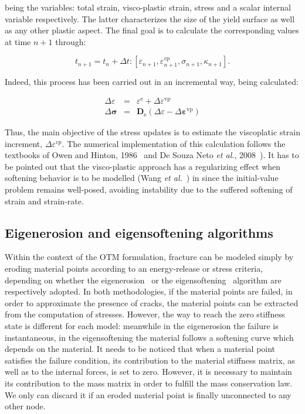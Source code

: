 \documentclass[applsci,journal,article,submit,moreauthors,pdftex]{Definitions/mdpi}
\begin{document}
\noindent being the variables: total strain, visco-plastic strain, stress and a scalar internal variable respectively. The latter characterizes the size of the yield surface as well as any other plastic aspect. The final goal is to calculate the corresponding values at time $n+1$ through:

\begin{equation}
t_{n+1}=t_{n}+\Delta t:\left[\varepsilon_{n+1}, \varepsilon_{n+1}^{v p}, \sigma_{n+1}, \kappa_{n+1}\right].
\end{equation}

Indeed, this process has been carried out in an incremental way, being calculated:

\begin{eqnarray}
\Delta \varepsilon &=& \varepsilon^{\mathrm{e}}+\Delta \varepsilon^{\mathrm{vp}} \\
\Delta \boldsymbol{\sigma} &=& \mathbf{D}_{\mathrm{e}}\left(\Delta \varepsilon-\Delta \boldsymbol{\varepsilon}^{\mathrm{vp}}\right)
\end{eqnarray}


Thus, the main objective of the stress updates is to estimate the viscoplatic strain increment, $\Delta \varepsilon^{v p}.$ The numerical implementation of this calculation follows the textbooks of Owen and Hinton, 1986~\cite{Owen1981} and De Souza Neto \textit{et al.}, 2008~\cite{DPOwen2005}). It has to be pointed out that the visco-plastic approach has a regularizing effect when softening behavior is to be modelled (Wang \textit{et al.}~\cite{Wang:1997}) in since the initial-value problem remains well-posed, avoiding instability due to the suffered softening of strain and strain-rate.


\subsection{Eigenerosion and eigensoftening algorithms}

Within the context of the OTM formulation, fracture can be modeled simply by eroding material points according to an energy-release or stress criteria, depending on whether the eigenerosion~\cite{schmidt09, Pandolfi_12, Li_12, Pandolfi_13} or the eigensoftening~\cite{Navas2018a,Yu2018,Molinos2020b} algorithm are respectively adopted. In both methodologies, if the material points are failed, in order to approximate the presence of cracks, the material points can be extracted from the computation of stresses. However, the way to reach the zero stiffness state is different for each model: meanwhile in the eigenerosion the failure is instantaneous, in the eigensoftening the material follows a softening curve which depends on the material. It needs to be noticed that when a material point satisfies the failure condition, its contribution to the material stiffness matrix, as well as to the internal forces, is set to zero. However, it is necessary to maintain its contribution to the mass matrix in order to fulfill the mass conservation law.  We only can discard it if an eroded material point is finally unconnected to any other node.
\end{document}

